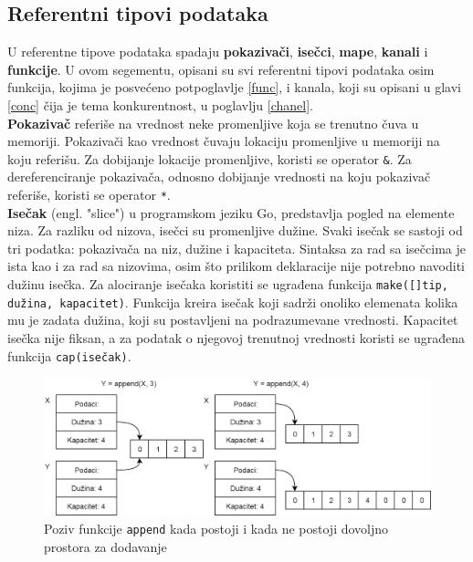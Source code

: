 \documentclass[12pt,oneside]{memoir}
\begin{document}
\subsection{Referentni tipovi podataka}
U referentne tipove podataka spadaju \textbf{pokazivači}, \textbf{isečci}, \textbf{mape}, \textbf{kanali} i \textbf{funkcije}. U ovom segementu, opisani su svi referentni tipovi podataka osim funkcija, kojima je posvećeno potpoglavlje \ref{func}, i kanala, koji su opisani u glavi \ref{conc} čija je tema konkurentnost, u poglavlju \ref{chanel}. 
\\

\textbf{Pokazivač} referiše na vrednost neke promenljive koja se trenutno čuva u memoriji. Pokazivači kao vrednost čuvaju lokaciju promenljive u memoriji na koju referišu. Za dobijanje lokacije promenljive, koristi se operator \texttt{\&}. Za dereferenciranje pokazivača, odnosno dobijanje vrednosti na koju pokazivač referiše, koristi se operator \texttt{*}.
\\

\textbf{Isečak} (engl. "slice") u programskom jeziku Go, predstavlja pogled na elemente niza. Za razliku od nizova, isečci su promenljive dužine. Svaki isečak se sastoji od tri podatka: pokazivača na niz, dužine i kapaciteta. Sintaksa za rad sa isečcima je ista kao i za rad sa nizovima, osim što prilikom deklaracije nije potrebno navoditi dužinu isečka. Za alociranje isečaka koristiti se ugrađena funkcija \texttt{make([]tip, dužina, kapacitet)}. Funkcija kreira isečak koji sadrži onoliko elemenata kolika mu je zadata dužina, koji su postavljeni na podrazumevane vrednosti. Kapacitet isečka nije fiksan, a za podatak o njegovoj trenutnoj vrednosti koristi se ugrađena funkcija \texttt{cap(isečak)}.

\begin{figure}
\begin{center}
\includegraphics[scale=0.33]{slice.png}
\end{center}
\caption{Poziv funkcije \texttt{append} kada postoji i kada ne postoji dovoljno prostora za dodavanje}
\label{fig:slice}
\end{figure}
\end{document}
